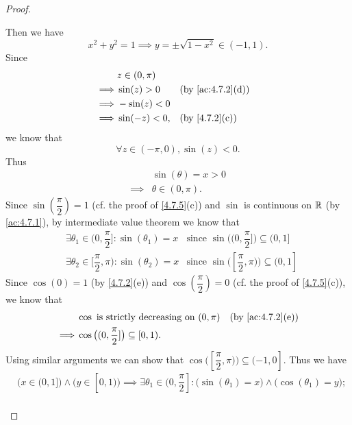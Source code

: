 \begin{proof}
\begin{itemize}
          Then we have
          \[
            x^2 + y^2 = 1 \implies y = \pm \sqrt{1 - x^2} \in (-1, 1).
          \]
          Since
          \begin{align*}
                     & z \in (0, \pi)                                     \\
            \implies & \sin(z) > 0    &  & \text{(by \cref{ac:4.7.2}(d))} \\
            \implies & -\sin(z) < 0                                       \\
            \implies & \sin(-z) < 0,  &  & \text{(by \cref{4.7.2}(c))}
          \end{align*}
          we know that
          \[
            \forall z \in (-\pi, 0), \sin(z) < 0.
          \]
          Thus
          \begin{align*}
                     & \sin(\theta) = x > 0 \\
            \implies & \theta \in (0, \pi).
          \end{align*}
          Since \(\sin(\dfrac{\pi}{2}) = 1\) (cf. the proof of \cref{4.7.5}(c)) and \(\sin\) is continuous on \(\mathbb{R}\) (by \cref{ac:4.7.1}), by intermediate value theorem we know that
          \begin{align*}
             & \exists \theta_1 \in (0, \dfrac{\pi}{2}] : \sin(\theta_1) = x   & \text{since } \sin\big((0, \dfrac{\pi}{2}]\big) \subseteq (0, 1]   \\
             & \exists \theta_2 \in [\dfrac{\pi}{2}, \pi) : \sin(\theta_2) = x & \text{since } \sin\big([\dfrac{\pi}{2}, \pi)\big) \subseteq (0, 1]
          \end{align*}
          Since \(\cos(0) = 1\) (by \cref{4.7.2}(e)) and \(\cos(\dfrac{\pi}{2}) = 0\) (cf. the proof of \cref{4.7.5}(c)), we know that
          \begin{align*}
                     & \cos \text{ is strictly decreasing on } (0, \pi)    &  & \text{(by \cref{ac:4.7.2}(e))} \\
            \implies & \cos\big((0, \dfrac{\pi}{2}]\big) \subseteq [0, 1).
          \end{align*}
          Using similar arguments we can show that \(\cos\big([\dfrac{\pi}{2}, \pi)\big) \subseteq (-1, 0]\).
          Thus we have
          \begin{align*}
             & \big(x \in (0, 1]\big) \land \big(y \in [0, 1)\big) \implies \exists \theta_1 \in (0, \dfrac{\pi}{2}] : \big(\sin(\theta_1) = x\big) \land \big(\cos(\theta_1) = y\big);    \\

\end{align*}
\end{itemize}
\end{proof}
